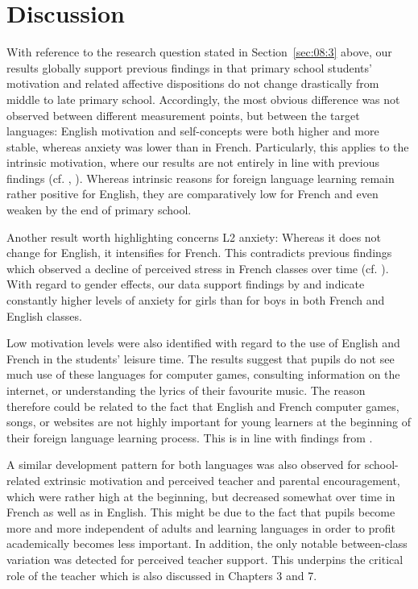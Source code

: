 \documentclass[output=paper]{langsci/langscibook}
\begin{document}
\section{Discussion}

With reference to the research question stated in Section~\ref{sec:08:3} above, our results globally support previous findings in that primary school students’ motivation and related affective dispositions do not change drastically from middle to late primary school. Accordingly, the most obvious difference was not observed between different measurement points, but between the target languages: English motivation and self-concepts were both higher and more stable, whereas anxiety was lower than in French. Particularly, this applies to the intrinsic motivation, where our results are not entirely in line with previous findings (cf. \citealt{Heinzmann2013}, \citealt{BruehwilerLePapeRacine2017}). Whereas intrinsic reasons for foreign language learning remain rather positive for English, they are comparatively low for French and even weaken by the end of primary school.

Another result worth highlighting concerns L2 anxiety: Whereas it does not change for English, it intensifies for French. This contradicts previous findings which observed a decline of perceived stress in French classes over time (cf. \citealt{SinghElmiger2017}). With regard to gender effects, our data support findings by \citet{DewaeleEtAl2016} and indicate constantly higher levels of anxiety for girls than for boys in both French and English classes.

Low motivation levels were also identified with regard to the use of English and French in the students’ leisure time. The results suggest that pupils do not see much use of these languages for computer games, consulting information on the internet, or understanding the lyrics of their favourite music. The reason therefore could be related to the fact that English and French computer games, songs, or websites are not highly important for young learners at the beginning of their foreign language learning process. This is in line with findings from \citet{Heinzmann2013}.

A similar development pattern for both languages was also observed for school-related extrinsic motivation and perceived teacher and parental encouragement, which were rather high at the beginning, but decreased somewhat over time in French as well as in English. This might be due to the fact that pupils become more and more independent of adults and learning languages in order to profit academically becomes less important. In addition, the only notable between-class variation was detected for perceived teacher support. This underpins the critical role of the teacher which is also discussed in Chapters 3 and 7. 
\end{document}
